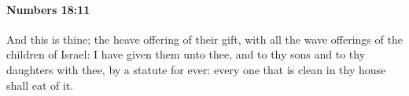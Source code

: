 
		\paragraph{Numbers 18:11} %
			\label{NUMBERS-18-11}

			And this is thine; the heave offering of their gift, with all the wave offerings of the children of Israel: I have given them unto thee, and to thy sons and to thy daughters with thee, by a statute for ever: every one that is clean in thy house shall eat of it.


